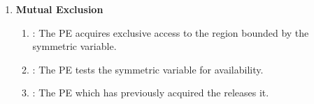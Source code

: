 \begin{enumerate}
\item \textbf{Mutual Exclusion}
\begin{enumerate}
  \item {}: The \ac{PE} acquires exclusive access to the region
      bounded by the symmetric  variable.
  \item {}: The \ac{PE} tests the symmetric  variable
      for availability.
  \item {}: The \ac{PE} which has previously acquired the
       releases it.
\end{enumerate}

\end{enumerate}
